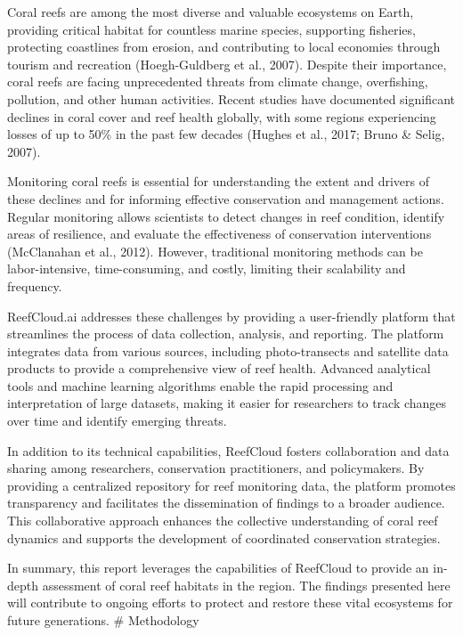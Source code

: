 \documentclass[
  letterpaper,
  DIV=11,
  numbers=noendperiod]{scrartcl}
\begin{document}
Coral reefs are among the most diverse and valuable ecosystems on Earth,
providing critical habitat for countless marine species, supporting
fisheries, protecting coastlines from erosion, and contributing to local
economies through tourism and recreation (Hoegh-Guldberg et al., 2007).
Despite their importance, coral reefs are facing unprecedented threats
from climate change, overfishing, pollution, and other human activities.
Recent studies have documented significant declines in coral cover and
reef health globally, with some regions experiencing losses of up to
50\% in the past few decades (Hughes et al., 2017; Bruno \& Selig,
2007).

Monitoring coral reefs is essential for understanding the extent and
drivers of these declines and for informing effective conservation and
management actions. Regular monitoring allows scientists to detect
changes in reef condition, identify areas of resilience, and evaluate
the effectiveness of conservation interventions (McClanahan et al.,
2012). However, traditional monitoring methods can be labor-intensive,
time-consuming, and costly, limiting their scalability and frequency.

ReefCloud.ai addresses these challenges by providing a user-friendly
platform that streamlines the process of data collection, analysis, and
reporting. The platform integrates data from various sources, including
photo-transects and satellite data products to provide a comprehensive
view of reef health. Advanced analytical tools and machine learning
algorithms enable the rapid processing and interpretation of large
datasets, making it easier for researchers to track changes over time
and identify emerging threats.

In addition to its technical capabilities, ReefCloud fosters
collaboration and data sharing among researchers, conservation
practitioners, and policymakers. By providing a centralized repository
for reef monitoring data, the platform promotes transparency and
facilitates the dissemination of findings to a broader audience. This
collaborative approach enhances the collective understanding of coral
reef dynamics and supports the development of coordinated conservation
strategies.

In summary, this report leverages the capabilities of ReefCloud to
provide an in-depth assessment of coral reef habitats in the region. The
findings presented here will contribute to ongoing efforts to protect
and restore these vital ecosystems for future generations. \pagebreak \#
Methodology
\end{document}
